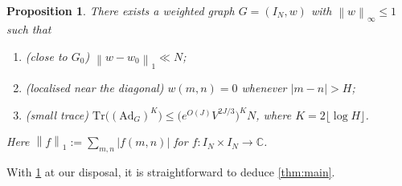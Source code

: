 \documentclass[11pt]{amsart}
\newtheorem{proposition}[theorem]{Proposition}
\theoremstyle{definition}
\renewcommand{\leq}{\leqslant}
\newcommand{\norm}[1]{\left\|#1\right\|}
\newcommand{\C}{\mathbb{C}}
\newcommand{\Ad}{\mathrm{Ad}}
\newcommand{\Tr}{\mathrm{Tr}}
\newcommand{\N}{I_N}
\newcommand{\curlyLexp}[1]{V^{#1}}
\newcommand{\graph}{G}
\newcommand{\repR}{J}
\newcommand{\repK}{K}
\begin{document}
\begin{proposition}
\label{prop:smalltrace}
There exists a weighted graph $\graph = (\N, w)$ with $\norm{w}_{\infty} \leq 1$ such that
\begin{enumerate}
	\item (close to $\graph_0$) $\norm{w-w_0}_1 \ll N$;
	\item (localised near the diagonal) $w(m,n) = 0$ whenever $|m-n| > H$;
	\item (small trace) $\Tr\big((\Ad_{\graph})^{\repK}\big) \leq \big( e^{O(\repR)} \curlyLexp{2\repR/3}\big)^{\repK} N$, where $\repK = 2\lfloor \log H\rfloor$.
\end{enumerate}
Here $\norm{f}_1 := \sum_{m,n}|f(m,n)|$ for $f:\N\times \N \to \C$.
\end{proposition}


With \cref{prop:smalltrace} at our disposal, it is straightforward to deduce \cref{thm:main}.
\end{document}
